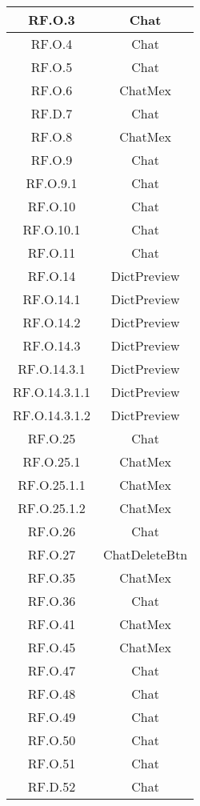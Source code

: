 \begin{adjustwidth}{-0.5cm}{-0.5cm}
\begin{longtable}{|c|c|}
    RF.O.3 & Chat\\
		\hline RF.O.4 & Chat\\
    \hline RF.O.5 & Chat\\
    \hline RF.O.6 & ChatMex\\
    \hline RF.D.7 & Chat\\
    \hline RF.O.8 & ChatMex\\
    \hline RF.O.9 & Chat\\
    \hline RF.O.9.1 & Chat\\
    \hline RF.O.10 & Chat\\
    \hline RF.O.10.1 & Chat\\
    \hline RF.O.11 & Chat\\
    \hline RF.O.14 & DictPreview\\
    \hline RF.O.14.1 & DictPreview\\
    \hline RF.O.14.2 & DictPreview\\
    \hline RF.O.14.3 & DictPreview\\
    \hline RF.O.14.3.1 & DictPreview\\
    \hline RF.O.14.3.1.1 & DictPreview\\
    \hline RF.O.14.3.1.2 & DictPreview\\
    \hline RF.O.25 & Chat\\
    \hline RF.O.25.1 & ChatMex\\
    \hline RF.O.25.1.1 & ChatMex\\
    \hline RF.O.25.1.2 & ChatMex\\
    \hline RF.O.26 & Chat\\
    \hline RF.O.27 & ChatDeleteBtn\\
    \hline RF.O.35 & ChatMex\\
    \hline RF.O.36 & Chat\\
    \hline RF.O.41 & ChatMex\\
    \hline RF.O.45 & ChatMex\\
    \hline RF.O.47 & Chat\\
    \hline RF.O.48 & Chat\\
    \hline RF.O.49 & Chat\\
    \hline RF.O.50 & Chat\\
    \hline RF.O.51 & Chat\\
    \hline RF.D.52 & Chat\\
  \end{longtable}
\end{adjustwidth}
\egroup